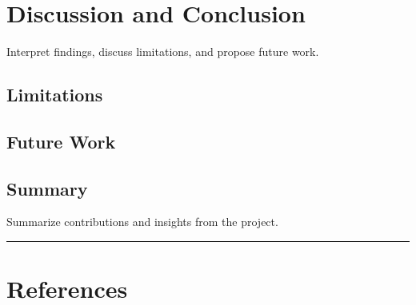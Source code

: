 \documentclass[
  letterpaper,
  DIV=11,
  numbers=noendperiod]{scrreprt}
\begin{document}
\chapter{Discussion and Conclusion}\label{discussion-and-conclusion}

Interpret findings, discuss limitations, and propose future work.

\section{Limitations}\label{limitations}

\section{Future Work}\label{future-work}

\section{Summary}\label{summary}

Summarize contributions and insights from the project.

\begin{center}\rule{0.5\linewidth}{0.5pt}\end{center}

\chapter{References}\label{references}
\end{document}
